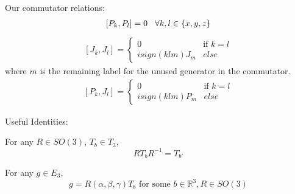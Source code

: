 \documentclass[compress,aspectratio=169,10pt,usenames,dvipsnames]{beamer}
\newcommand{\R}{\mathbb{R}}
\begin{document}
\begin{frame}
\vfill
Our commutator relations:
\vfill
\begin{equation}
\begin{aligned}
	[P_k,P_l] = 0 \hspace{3mm} \forall k,l\in \{x,y,z\}
\end{aligned}
\end{equation}
\begin{equation}
\begin{aligned}
	[J_k,J_l] = \begin{cases}
					0 & \text{if } k = l\\
					isign(klm)J_m & else
					\end{cases}
\end{aligned}
\end{equation}
where $m$ is the remaining label for the unused generator in the commutator.
\begin{equation}
\begin{aligned}
	[P_k,J_l] = \begin{cases}
					0 & \text{if } k = l\\
					isign(klm)P_m & else \end{cases}
\end{aligned}
\end{equation}
\vfill
\end{frame}
%
%
\begin{frame}
\vfill
Useful Identities:
\vfill
\begin{theorem}
For any $R\in SO(3)$, $T_b\in T_3$,
$$RT_bR^{-1} = T_{b'}$$
\end{theorem}
\vfill
\begin{theorem}
For any $g\in E_3$, $$g = R(\alpha,\beta,\gamma)T_b\text{ for some } b\in\R^3, R\in SO(3)$$
\end{theorem}
\vfill
\end{frame}
\end{document}
